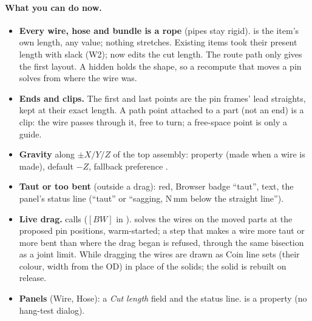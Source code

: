 \paragraph{What you can do now.}
\begin{itemize}[nosep]
  \item \textbf{Every wire, hose and bundle is a rope} (pipes stay rigid).  is the item's own length,
        any value; nothing stretches. Existing items took their present length with slack (W2);  now edits
        the cut length. The route path only gives the first layout. A hidden  holds the shape, so a
        recompute that moves a pin solves from where the wire was.
  \item \textbf{Ends and clips.} The first and last points are the pin frames' lead straights, kept at their exact
        length. A path point attached to a part (not an end) is a clip: the wire passes through it, free to turn; a
        free-space point is only a guide.
  \item \textbf{Gravity} along $\pm X/Y/Z$ of the top assembly: property  (made when a wire is
        made), default $-Z$, fallback preference .
  \item \textbf{Taut or too bent} (outside a drag): red, Browser badge ``taut'',  text, the panel's
        status line (``taut'' or ``sagging, N\,mm below the straight line'').
  \item \textbf{Live drag.}  calls  ($[BW]$ in
        ).  solves the wires on the moved parts at the proposed pin
        positions, warm-started; a step that makes a wire more taut or more bent than where the drag began is
        refused, through the same bisection as a joint limit. While dragging the wires are drawn as Coin line sets (their
        colour, width from the OD) in place of the solids; the solid is rebuilt on release.
  \item \textbf{Panels} (Wire, Hose): a \emph{Cut length} field and the status line.  is a
        property (no hang-test dialog).
\end{itemize}

